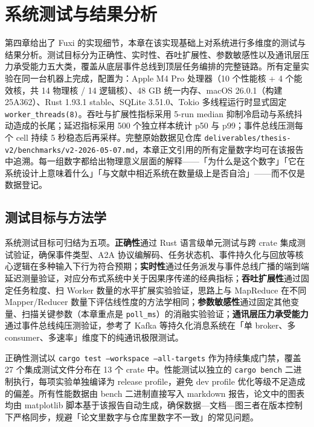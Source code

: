 \section{系统测试与结果分析}

第四章给出了 Fuxi 的实现细节，本章在该实现基础上对系统进行多维度的测试与结果分析。测试目标分为正确性、实时性、吞吐扩展性、参数敏感性以及通讯层压力承受能力五大类，覆盖从底层事件总线到顶层任务编排的完整链路。所有定量实验在同一台机器上完成，配置为：Apple M4 Pro 处理器（10 个性能核 + 4 个能效核，共 14 物理核 / 14 逻辑核）、48 GB 统一内存、macOS 26.0.1（构建 25A362）、Rust 1.93.1 stable、SQLite 3.51.0、Tokio 多线程运行时显式固定 \texttt{worker\_threads(8)}。吞吐与扩展性指标采用 5-run median 抑制冷启动与系统抖动造成的长尾；延迟指标采用 500 个独立样本统计 p50 与 p99；事件总线压测每个 cell 持续 5 秒稳态后再采样。完整原始数据见仓库 \texttt{deliverables/thesis-v2/benchmarks/v2-2026-05-07.md}，本章正文引用的所有定量数字均可在该报告中追溯。每一组数字都给出物理意义层面的解释——「为什么是这个数字」「它在系统设计上意味着什么」「与文献中相近系统在数量级上是否自洽」——而不仅是数据登记。

\subsection{测试目标与方法学}

系统测试目标可归结为五项。\textbf{正确性}通过 Rust 语言级单元测试与跨 crate 集成测试验证，确保事件类型、A2A 协议编解码、任务状态机、事件持久化与回放等核心逻辑在多种输入下行为符合预期；\textbf{实时性}通过任务派发与事件总线广播的端到端延迟测量验证，对应分布式系统中关于因果序传递的经典指标\cite{lamport1978time}；\textbf{吞吐扩展性}通过固定任务粒度、扫 Worker 数量的水平扩展实验验证，思路上与 MapReduce 在不同 Mapper/Reducer 数量下评估线性度的方法学相同\cite{dean2004mapreduce}；\textbf{参数敏感性}通过固定其他变量、扫描关键参数（本章重点是 \texttt{poll\_ms}）的消融实验验证；\textbf{通讯层压力承受能力}通过事件总线纯压测验证，参考了 Kafka 等持久化消息系统在「单 broker、多 consumer、多速率」维度下的纯通讯极限测试\cite{kreps2011kafka}。

正确性测试以 \texttt{cargo test --workspace --all-targets} 作为持续集成门禁，覆盖 27 个集成测试文件分布在 13 个 crate 中。性能测试以独立的 \texttt{cargo bench} 二进制执行，每项实验单独编译为 release profile，避免 dev profile 优化等级不足造成的偏差。所有性能数据由 bench 二进制直接写入 markdown 报告，论文中的图表均由 matplotlib 脚本基于该报告自动生成，确保数据—文档—图三者在版本控制下严格同步，规避「论文里数字与仓库里数字不一致」的常见问题。

